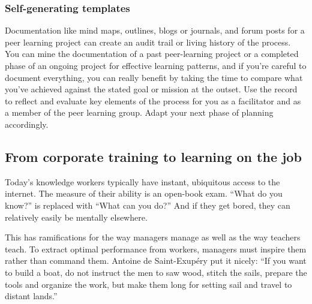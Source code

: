 \subsubsection{Self-generating templates}

Documentation like mind maps, outlines, blogs or journals, and forum
posts for a peer learning project can create an audit trail or living
history of the process. You can mine the documentation of a past
peer-learning project or a completed phase of an ongoing project for
effective learning patterns, and if you're careful to document
everything, you can really benefit by taking the time to compare what
you've achieved against the stated goal or mission at the outset. Use
the record to reflect and evaluate key elements of the process for you
as a facilitator and as a member of the peer learning group. Adapt your
next phase of planning accordingly.

\subsection{From corporate training to learning on the job}


Today's knowledge workers typically have instant, ubiquitous access to
the internet. The measure of their ability is an open-book exam. ``What
do you know?'' is replaced with ``What can you do?'' And if they get
bored, they can relatively easily be mentally elsewhere.

This has ramifications for the way managers manage as well as the way
teachers teach. To extract optimal performance from workers, managers
must inspire them rather than command them. Antoine de Saint-Exupéry put
it nicely: ``If you want to build a boat, do not instruct the men to saw
wood, stitch the sails, prepare the tools and organize the work, but
make them long for setting sail and travel to distant lands.''


